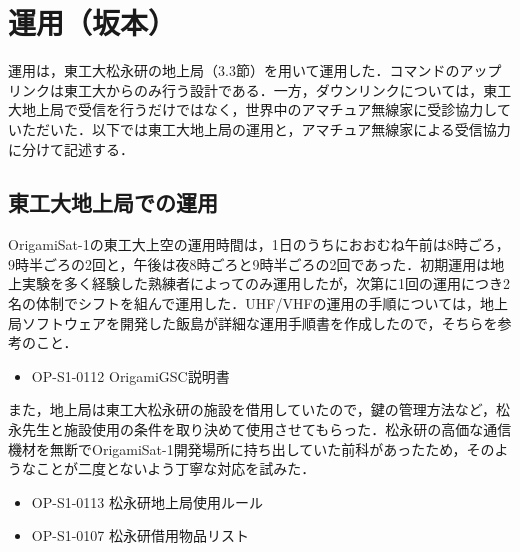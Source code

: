 \section{運用（坂本）}

運用は，東工大松永研の地上局（3.3節）を用いて運用した．コマンドのアップリンクは東工大からのみ行う設計である．一方，ダウンリンクについては，東工大地上局で受信を行うだけではなく，世界中のアマチュア無線家に受診協力していただいた．以下では東工大地上局の運用と，アマチュア無線家による受信協力に分けて記述する．

\subsection{東工大地上局での運用}

OrigamiSat-1の東工大上空の運用時間は，1日のうちにおおむね午前は8時ごろ，9時半ごろの2回と，午後は夜8時ごろと9時半ごろの2回であった．初期運用は地上実験を多く経験した熟練者によってのみ運用したが，次第に1回の運用につき2名の体制でシフトを組んで運用した．UHF/VHFの運用の手順については，地上局ソフトウェアを開発した飯島が詳細な運用手順書を作成したので，そちらを参考のこと．
\begin{itemize}
	\item OP-S1-0112  OrigamiGSC説明書
\end{itemize}

また，地上局は東工大松永研の施設を借用していたので，鍵の管理方法など，松永先生と施設使用の条件を取り決めて使用させてもらった．松永研の高価な通信機材を無断でOrigamiSat-1開発場所に持ち出していた前科があったため，そのようなことが二度とないよう丁寧な対応を試みた．
\begin{itemize}
	\item OP-S1-0113 松永研地上局使用ルール
	\item OP-S1-0107 松永研借用物品リスト
\end{itemize}

